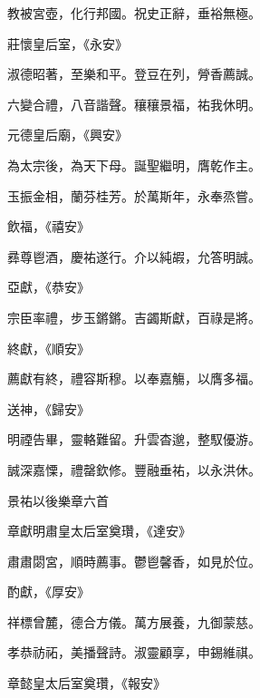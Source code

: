 \begin{pinyinscope}
 教被宮壺，化行邦國。祝史正辭，垂裕無極。



 莊懷皇后室，《永安》



 淑德昭著，至樂和平。登豆在列，膋香薦誠。



 六變合禮，八音諧聲。穰穰景福，祐我休明。



 元德皇后廟，《興安》



 為太宗後，為天下母。誕聖繼明，膺乾作主。



 玉振金相，蘭芬桂芳。於萬斯年，永奉烝嘗。



 飲福，《禧安》



 彞尊鬯酒，慶祐遂行。介以純嘏，允答明誠。



 亞獻，《恭安》



 宗臣率禮，步玉鏘鏘。吉蠲斯獻，百祿是將。



 終獻，《順安》



 薦獻有終，禮容斯穆。以奉嘉觴，以膺多福。



 送神，《歸安》



 明禋告畢，靈輅難留。升雲杳邈，整馭優游。



 誠深嘉慄，禮罄欽修。豐融垂祐，以永洪休。



 景祐以後樂章六首



 章獻明肅皇太后室奠瓚，《達安》



 肅肅閟宮，順時薦事。鬱鬯馨香，如見於位。



 酌獻，《厚安》



 祥標曾麓，德合方儀。萬方展養，九御蒙慈。



 孝恭祊祏，美播聲詩。淑靈顧享，申錫維祺。



 章懿皇太后室奠瓚，《報安》




\end{pinyinscope}
